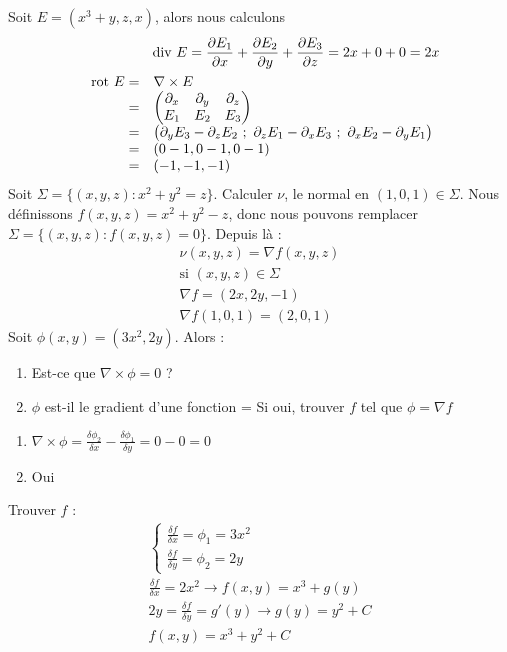 \documentclass[12pt,a4paper]{article}
\begin{document}
 Soit $E = (x^3 + y, z, x)$, alors nous calculons
\begin{align*}
	\dive E = \frac{\partial E_1}{\partial x} + \frac{\partial E_2}{\partial y} + \frac{\partial E_3}{\partial z} = 2x + 0 + 0 = 2x\\
	\begin{array}{rl}
		\rot E = & \nabla \times E \\ =  &
		\begin{pmatrix}
			\partial_x & \partial_y & \partial_z\\
			E_1 & E_2 & E_3
		\end{pmatrix}\\ = &\big(\partial_yE_3 - \partial_zE_2 \ ; \ \partial_zE_1 - \partial_xE_3 \ ; \ \partial_xE_2 - \partial_yE_1 \big)\\
		=& (0-1,0-1,0-1)\\
		=& (-1,-1,-1)
		\end{array}	
\end{align*}
 Soit $\Sigma = \{(x,y,z) : x^2 + y^2 = z\}$. Calculer $\nu$, le normal en $(1,0,1) \in \Sigma$. Nous définissons $f(x,y,z) = x^2 + y^2 - z$, donc nous pouvons remplacer $\Sigma = \{(x,y,z): f(x,y,z) = 0\}$. Depuis là :
\begin{align*}
	\nu(x,y,z) = \nabla f(x,y,z)\\
	\text{si } (x,y,z) \in \Sigma\\
	\nabla f = (2x, 2y, -1)\\
	\nabla f(1,0,1) = (2,0,1)
\end{align*}
 Soit $\phi(x,y) = (3x^2, 2y)$. Alors :
\begin{enumerate}
	\item 	Est-ce que $\nabla \times \phi = 0$ ?
	\item $\phi$ est-il le gradient d'une fonction = Si oui, trouver $f$ tel que $\phi = \nabla f$
\end{enumerate}
\begin{enumerate}
	\item 	$\nabla \times \phi = \frac{\delta \phi_2}{\delta x} - \frac{\delta \phi_1}{\delta y} = 0-0 = 0$
	\item 	Oui
\end{enumerate}
Trouver $f$ : 
\begin{align*}
	\left\{\begin{array}{l}
		\frac{\delta f}{\delta x} = \phi_1 = 3x^2\\
		\frac{\delta f}{\delta y} = \phi_2 = 2y
	\end{array}\right.\\
	\frac{\delta f}{\delta x} = 2x^2 \to f(x,y) = x^3 + g(y)\\
	2y = \frac{\delta f}{\delta y} = g'(y) \to g(y) = y^2 + C\\
	f(x,y) = x^3 + y^2 + C
\end{align*}
\end{document}
